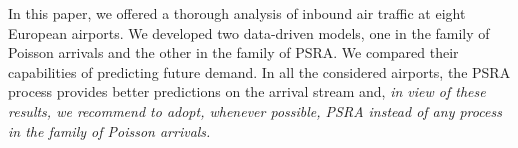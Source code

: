 \documentclass[draft,review]{elsarticle}
\begin{document}





  In this paper, we offered a thorough analysis of inbound air traffic at eight European airports. We developed two data-driven models, one in the family of Poisson arrivals and the other in the family of \ac{PSRA}.
  We compared their capabilities of predicting future demand.
  In all the considered airports, the \ac{PSRA} process provides better predictions on the arrival stream and, \emph{in view of these results, we recommend to adopt, whenever possible, \ac{PSRA} instead of any process in the family of Poisson arrivals.}
\end{document}

